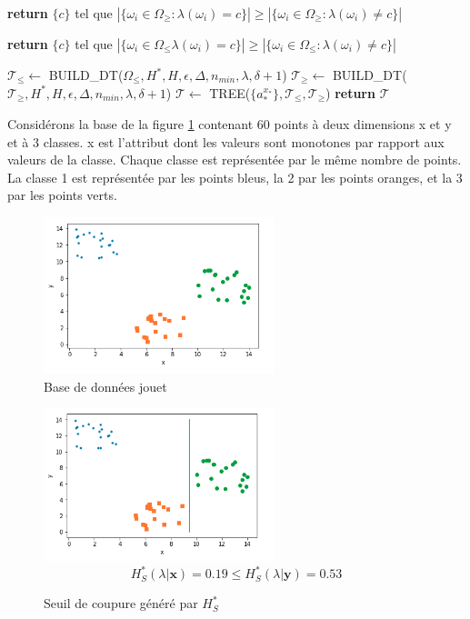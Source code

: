 \documentclass[a4paper]{article}
\begin{document}
\begin{algorithm}[H]
\begin{algorithmic}
    \State \textbf{return} $\{c\}$ tel que $|\{\omega_i \in \Omega_{\geq}:
    \lambda(\omega_i) = c\}| \geq |\{\omega_i \in \Omega_{\geq}:
    \lambda(\omega_i) \neq c\}|$
\EndIf

    \State \textbf{return} $\{c\}$ tel que $|\{\omega_i \in \Omega_{\leq}
    \lambda(\omega_i) = c\}| \geq |\{\omega_i \in \Omega_{\leq}:
    \lambda(\omega_i) \neq c\}|$
\EndIf

\State $\mathcal{T}_{\leq}\gets$ BUILD\_DT($\Omega_{\leq}, H^*, H, \epsilon, \Delta,
    n_{min}, \lambda, \delta +1$) 
\State $\mathcal{T}_{\geq}\gets$
    BUILD\_DT($\mathcal{T}_{\geq}, H^*, H, \epsilon, \Delta, n_{min}, \lambda, \delta
    +1$)
\State $\mathcal{T} \gets$ TREE($\{a^{x_*}_*\}, \mathcal{T}_{\leq}, \mathcal{T}_{\geq}$)
\State \textbf{return} $\mathcal{T}$

\EndProcedure
\end{algorithmic}
\end{algorithm}

Considérons la base de la figure \ref{img:artificial-dataset} contenant 60
points à deux dimensions x et y et à 3 classes. x est l'attribut dont les valeurs sont
monotones par rapport aux valeurs de la classe. Chaque classe est représentée
par le même nombre de points. La classe 1 est
représentée par les points bleus, la 2 par les points oranges, et la 3 par les
points verts. 

\begin{figure}[H]
	\center 
	\includegraphics[width=0.6\textwidth]{images/artificial-dataset.png}
    \caption{Base de données jouet}
    \label{img:artificial-dataset}
\end{figure}

\begin{figure}[H]
	\center 
	\includegraphics[width=0.6\textwidth]{images/threshold_rsdm.png}
    $$H^*_S(\lambda | \mathbf{x}) =  0.19 \leq H^*_S(\lambda | \mathbf{y}) =  0.53$$
    \caption{Seuil de coupure généré par $H^*_S$}
    \label{img:threshold_rsdm}
\end{figure}
\end{document}

